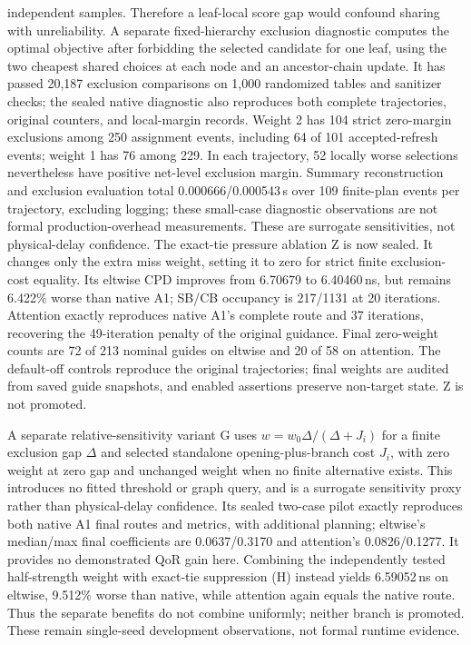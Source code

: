 \documentclass[conference,10pt]{IEEEtran}
\begin{document}
independent samples. Therefore a leaf-local score gap would confound sharing with unreliability. A separate fixed-hierarchy exclusion diagnostic computes the optimal objective after forbidding the selected candidate for one leaf, using the two cheapest shared choices at each node and an ancestor-chain update. It has passed 20,187 exclusion comparisons on 1,000 randomized tables and sanitizer checks; the sealed native diagnostic also reproduces both complete trajectories, original counters, and local-margin records. Weight 2 has 104 strict zero-margin exclusions among 250 assignment events, including 64 of 101 accepted-refresh events; weight 1 has 76 among 229. In each trajectory, 52 locally worse selections nevertheless have positive net-level exclusion margin. Summary reconstruction and exclusion evaluation total 0.000666/0.000543\,s over 109 finite-plan events per trajectory, excluding logging; these small-case diagnostic observations are not formal production-overhead measurements. These are surrogate sensitivities, not physical-delay confidence. The exact-tie pressure ablation Z is now sealed. It changes only the extra miss weight, setting it to zero for strict finite exclusion-cost equality. Its eltwise CPD improves from 6.70679 to 6.40460\,ns, but remains 6.422\% worse than native A1; SB/CB occupancy is 217/1131 at 20 iterations. Attention exactly reproduces native A1's complete route and 37 iterations, recovering the 49-iteration penalty of the original guidance. Final zero-weight counts are 72 of 213 nominal guides on eltwise and 20 of 58 on attention. The default-off controls reproduce the original trajectories; final weights are audited from saved guide snapshots, and enabled assertions preserve non-target state. Z is not promoted.

A separate relative-sensitivity variant G uses $w=w_0\Delta/(\Delta+J_i)$ for a finite exclusion gap $\Delta$ and selected standalone opening-plus-branch cost $J_i$, with zero weight at zero gap and unchanged weight when no finite alternative exists. This introduces no fitted threshold or graph query, and is a surrogate sensitivity proxy rather than physical-delay confidence. Its sealed two-case pilot exactly reproduces both native A1 final routes and metrics, with additional planning; eltwise's median/max final coefficients are 0.0637/0.3170 and attention's 0.0826/0.1277. It provides no demonstrated QoR gain here. Combining the independently tested half-strength weight with exact-tie suppression (H) instead yields 6.59052\,ns on eltwise, 9.512\% worse than native, while attention again equals the native route. Thus the separate benefits do not combine uniformly; neither branch is promoted. These remain single-seed development observations, not formal runtime evidence.
\end{document}
